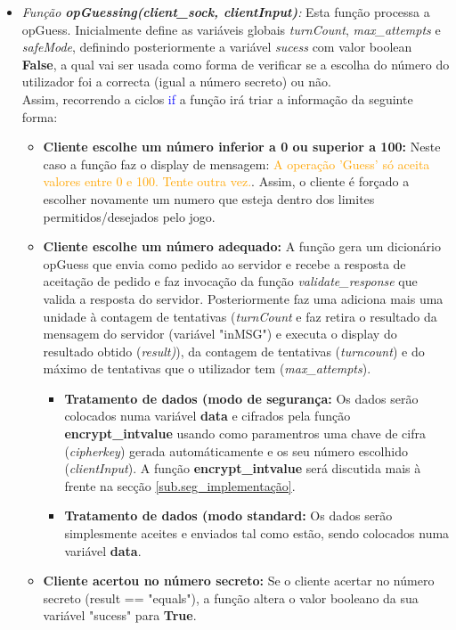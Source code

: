 \begin{itemize}
	\item\textsl{Função \textbf{opGuessing(client\_sock, clientInput)}:} Esta função processa a opGuess. Inicialmente define as variáveis globais \textsl{turnCount}, \textsl{max\_attempts} e \textsl{safeMode}, definindo posteriormente a variável \textit{sucess} com valor boolean \textbf{False}, a qual vai ser usada como forma de verificar se a escolha do número do utilizador foi a correcta (igual a número secreto) ou não.\\
	Assim, recorrendo a ciclos \textcolor{blue}{if} a função irá triar a informação da seguinte forma:	
	\begin{itemize}
		\item\textbf{{Cliente escolhe um número inferior a 0 ou superior a 100:}} Neste caso a função faz o display de mensagem: \textcolor{orange}{A operação 'Guess' só aceita valores entre 0 e 100. Tente outra vez.}. Assim, o cliente é forçado a escolher novamente um numero que esteja dentro dos limites permitidos/desejados pelo jogo.
		\item\textbf{{Cliente escolhe um número adequado:}} A função gera um dicionário opGuess que envia como pedido ao servidor e recebe a resposta de aceitação de pedido e faz invocação da função \textsl{validate\_response} que valida a resposta do servidor. Posteriormente faz uma adiciona mais uma unidade à contagem de tentativas (\textsl{turnCount} e faz retira o resultado da mensagem do servidor (variável "inMSG") e executa o display do resultado obtido (\textsl{result)}), da contagem de tentativas (\textsl{turncount}) e do máximo de tentativas que o utilizador tem (\textsl{max\_attempts}).
		\begin{itemize}		
			\item\textbf{{Tratamento de dados (modo de segurança:}} Os dados serão colocados numa variável \textbf{data} e cifrados pela função \textbf{encrypt\_intvalue} usando como paramentros uma chave de cifra (\textsl{cipherkey}) gerada automáticamente e os seu número escolhido (\textsl{clientInput}). A função \textbf{encrypt\_intvalue} será discutida mais à frente na secção  \ref{sub.seg_implementação}.
			\item\textbf{{Tratamento de dados (modo standard:}} Os dados serão simplesmente aceites e enviados tal como estão, sendo colocados numa variável \textbf{data}.
		\end{itemize}		
		\item\textbf{{Cliente acertou no número secreto:}} Se o cliente acertar no número secreto (result == "equals"), a função altera o valor booleano da sua variável "sucess" para \textbf{True}.	

	\end{itemize}		
\end{itemize}

